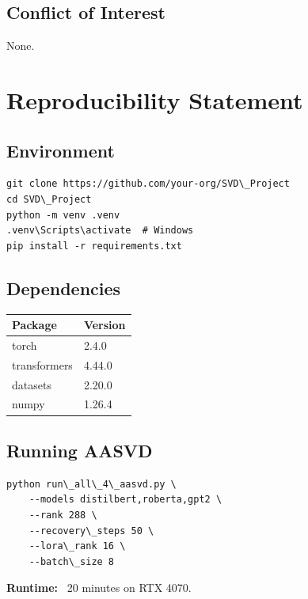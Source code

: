 \subsection{Conflict of Interest}

None.


\section{Reproducibility Statement}

\subsection{Environment}

\begin{lstlisting}
git clone https://github.com/your-org/SVD\_Project
cd SVD\_Project
python -m venv .venv
.venv\Scripts\activate  # Windows
pip install -r requirements.txt
\end{lstlisting}

\subsection{Dependencies}

\begin{table}[H]
\centering
\small
\begin{tabular}{ll}
\toprule
\textbf{Package} & \textbf{Version} \\
\midrule
torch & 2.4.0 \\
transformers & 4.44.0 \\
datasets & 2.20.0 \\
numpy & 1.26.4 \\
\bottomrule
\end{tabular}
\end{table}

\subsection{Running AASVD}

\begin{lstlisting}
python run\_all\_4\_aasvd.py \
    --models distilbert,roberta,gpt2 \
    --rank 288 \
    --recovery\_steps 50 \
    --lora\_rank 16 \
    --batch\_size 8
\end{lstlisting}

\textbf{Runtime:} ~20 minutes on RTX 4070.

